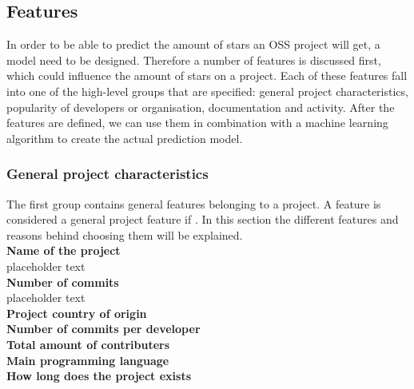         
        
    
    
    \subsection{Features}
    In order to be able to predict the amount of stars an OSS project will get, a model need to be designed.
    Therefore a number of features is discussed first, which could influence the amount of stars on a project.
    Each of these features fall into one of the high-level groups that are specified: general project characteristics, popularity of developers or organisation, documentation and activity.
    After the features are defined, we can use them in combination with a machine learning algorithm to create the actual prediction model.

    \subsubsection{General project characteristics}
    The first group contains general features belonging to a project. 
    A feature is considered a general project feature if .
    In this section the different features and reasons behind choosing them will be explained.\\
    \textbf{Name of the project}\\
    placeholder text \\
    \textbf{Number of commits}\\
    placeholder text \\
    \textbf{Project country of origin}\\
    \textbf{Number of commits per developer}\\
    \textbf{Total amount of contributers}\\
    \textbf{Main programming language}\\
    \textbf{How long does the project exists}\\

